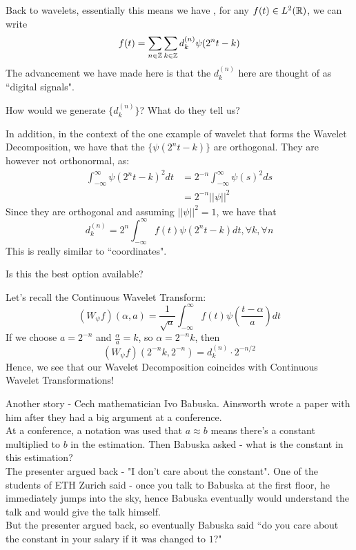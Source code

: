 \documentclass{article}
\begin{document}
Back to wavelets, essentially this means we have , for any $f(t) \in L^2(\mathbb{R})$, we can write
    \[f(t) = \sum_{n \in \mathbb{Z}} \sum_{k \in \mathbb{Z}} d_k^{(n)} \psi(2^n t - k)\]
The advancement we have made here is that the $d_k^{(n)}$ here are thought of as ``digital signals".

\begin{question}
    How would we generate $\{d_k^{(n)}\}$? What do they tell us?
\end{question}

In addition, in the context of the one example of wavelet that forms the Wavelet Decomposition, we have that the $\{\psi(2^n t - k)\}$ are orthogonal. They are however not orthonormal, as:
\begin{align*}
    \int_{-\infty}^\infty \psi(2^n t - k)^2 dt &= 2^{-n} \int_{-\infty}^\infty \psi(s)^2 ds\\
    &= 2^{-n} ||\psi||^2
\end{align*}
Since they are orthogonal and assuming $||\psi||^2 = 1$, we have that 
\[d_k^{(n)} = 2^n \int_{-\infty}^{\infty} f(t) \psi(2^n t - k) dt, \forall k, \forall n\]
This is really similar to ``coordinates".

\begin{question}
    Is this the best option available?
\end{question}

Let's recall the Continuous Wavelet Transform:
\[(W_\psi f)(\alpha, a) = \frac{1}{\sqrt{a}} \int_{-\infty}^{\infty} f(t) \psi(\frac{t - \alpha}{a}) dt\]
If we choose $a = 2^{-n}$ and $\frac{\alpha}{a} = k$, so $\alpha = 2^{-n} k$, then
\[(W_\psi f)(2^{-n} k, 2^{-n}) = d_k^{(n)} \cdot 2^{-n/2}\]
Hence, we see that our Wavelet Decomposition coincides with Continuous Wavelet Transformations!

\begin{remark}
    Another story - Cech mathematician Ivo Babuska. Ainsworth wrote a paper with him after they had a big argument at a conference.\\

    At a conference, a notation was used that $a \approx b$ means there's a constant multiplied to $b$ in the estimation. Then Babuska asked - what is the constant in this estimation?\\

    The presenter argued back - "I don't care about the constant".
    One of the students of ETH Zurich said - once you talk to Babuska at the first floor, he immediately jumps into the sky, hence Babuska eventually would understand the talk and would give the talk himself.\\

    But the presenter argued back, so eventually Babuska said ``do you care about the constant in your salary if it was changed to $1$?"
\end{remark}
\end{document}
